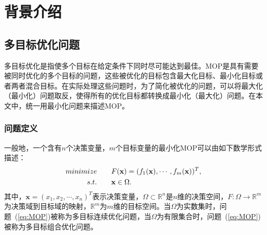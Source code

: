 \chapter{背景介绍}
\label{chap:背景介绍}
\section{多目标优化问题}
\label{sec:背景介绍:多目标优化问题}
多目标优化是指使多个目标在给定条件下同时尽可能达到最佳。MOP是具有需要被同时优化的多个目标的问题，这些被优化的目标包含最大化目标、最小化目标或者两者混合目标。在实际处理这些问题时，为了简化被优化的问题，可以将最大化（最小化）问题取反，使得所有的优化目标都转换成最小化（最大化）问题。在本文中，统一用最小化问题来描述MOP。

\subsection{问题定义}
\label{subsec:背景介绍:多目标优化问题:问题定义}
一般地，一个含有$n$个决策变量，$m$个目标变量的最小化MOP可以由如下数学形式描述：
\begin{align}
    \label{eq:MOP}
    minimize \qquad & F(\mathbf{x}) = (f_1(\mathbf{x}), \cdots, f_m(\mathbf{x}))^T,  \\
    s.t. \qquad & \mathbf{x} \in \Omega. \notag
\end{align}
其中，$\mathbf{x} = (x_1, x_2, \cdots, x_n)^T$表示决策变量，$\Omega \subset \mathbb{R}^n$是$n$维的决策空间，$F: \Omega \rightarrow \mathbb{R}^m$为决策域到目标域的映射，$\mathbb{R}^m$为$m$维的目标空间。当$\Omega$为实数集时，问题~(\ref{eq:MOP})被称为多目标连续优化问题，当$\Omega$为有限集合时，问题~(\ref{eq:MOP})被称为多目标组合优化问题。

